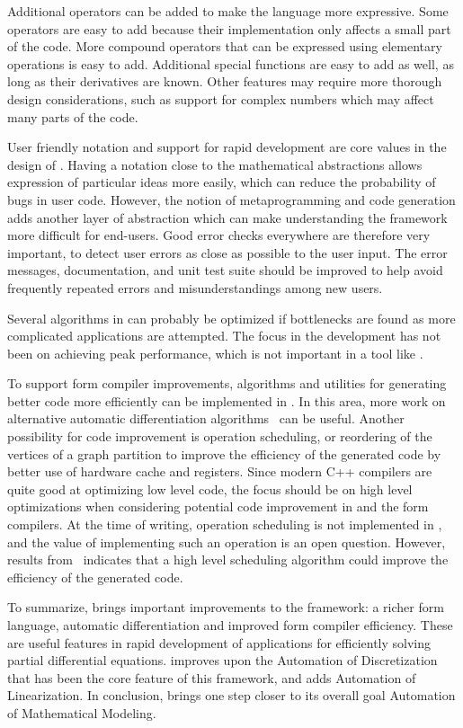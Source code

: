 Additional operators can be added to make the language more
expressive. Some operators are easy to add because their
implementation only affects a small part of the code.  More compound
operators that can be expressed using elementary operations is easy to
add.  Additional special functions are easy to add as well, as long as
their derivatives are known.  Other features may require more thorough
design considerations, such as support for complex numbers which may
affect many parts of the code.

User friendly notation and support for rapid development are core
values in the design of \ufl{}.  Having a notation close to the
mathematical abstractions allows expression of particular ideas more
easily, which can reduce the probability of bugs in user code.
However, the notion of metaprogramming and code generation adds
another layer of abstraction which can make understanding the
framework more difficult for end-users.  Good error checks everywhere
are therefore very important, to detect user errors as close as
possible to the user input.  The error messages, documentation, and
unit test suite should be improved to help avoid frequently repeated
errors and misunderstandings among new users.

Several algorithms in \ufl{} can probably be optimized if bottlenecks
are found as more complicated applications are attempted. The focus in
the development has not been on achieving peak performance, which is
not important in a tool like \ufl{}.

To support form compiler improvements, algorithms and utilities for
generating better code more efficiently can be implemented in \ufl{}.
In this area, more work on alternative automatic differentiation
algorithms~\cite{ForTad2004,Tad2008} can be useful.  Another
possibility for code improvement is operation scheduling, or
reordering of the vertices of a graph partition to improve the
efficiency of the generated code by better use of hardware cache and
registers. Since modern C++ compilers are quite good at optimizing low
level code, the focus should be on high level optimizations when
considering potential code improvement in \ufl{} and the form
compilers.  At the time of writing, operation scheduling is not
implemented in \ufl{}, and the value of implementing such an operation
is an open question.  However, results from~\cite{ForTad2004}
indicates that a high level scheduling algorithm could improve the
efficiency of the generated code.

To summarize, \ufl{} brings important improvements to the \fenics{}
framework: a richer form language, automatic differentiation and
improved form compiler efficiency.  These are useful features in rapid
development of applications for efficiently solving partial
differential equations.  \ufl{} improves upon the Automation of
Discretization that has been the core feature of this framework, and
adds Automation of Linearization.  In conclusion, \ufl{} brings
\fenics{} one step closer to its overall goal Automation of
Mathematical Modeling.


